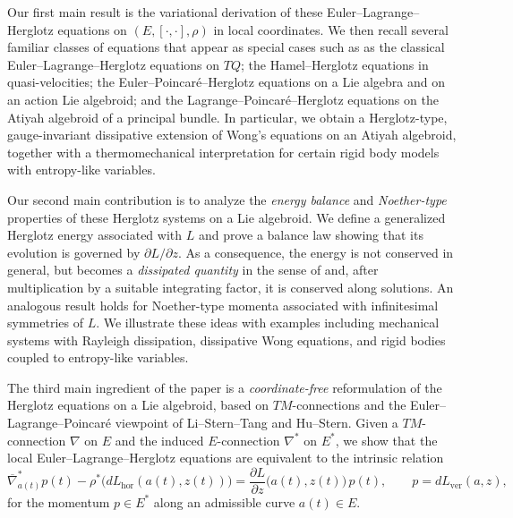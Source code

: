 \documentclass[11pt,a4paper]{article}
\theoremstyle{definition}
\begin{document}
Our first main result is the variational derivation of these
Euler--Lagrange--Herglotz equations on $(E,[\cdot,\cdot],\rho)$ in local coordinates. We then recall several familiar classes of equations that appear
as special cases such as as the classical Euler--Lagrange--Herglotz equations on $TQ$; the Hamel--Herglotz equations in quasi-velocities; the Euler--Poincar\'e--Herglotz equations on a Lie algebra and on an
        action Lie algebroid;
 and the Lagrange--Poincar\'e--Herglotz equations on the Atiyah algebroid
        of a principal bundle. In particular, we obtain a Herglotz-type, gauge-invariant dissipative
extension of Wong's equations on an Atiyah algebroid, together with a
thermomechanical interpretation for certain rigid body models with
entropy-like variables.

Our second main contribution is to analyze the \emph{energy balance} and
\emph{Noether-type} properties of these Herglotz systems on a Lie
algebroid.
We define a generalized Herglotz energy associated with $L$ and prove
a balance law showing that its evolution is governed by
$\partial L/\partial z$.
As a consequence, the energy is not conserved in general, but becomes
a \emph{dissipated quantity} in the sense of \cite{de2021symmetries} and,
after multiplication by a suitable integrating factor, it is
conserved along solutions.
An analogous result holds for Noether-type momenta associated with
infinitesimal symmetries of $L$.
We illustrate these ideas with examples including mechanical systems
with Rayleigh dissipation, dissipative Wong equations, and rigid bodies
coupled to entropy-like variables.

The third main ingredient of the paper is a \emph{coordinate-free}
reformulation of the Herglotz equations on a Lie algebroid, based on
$TM$-connections and the Euler--Lagrange--Poincar\'e viewpoint of
Li--Stern--Tang and Hu--Stern.
Given a $TM$-connection $\nabla$ on $E$ and the induced $E$-connection
$\nabla^*$ on $E^*$, we show that the local Euler--Lagrange--Herglotz
equations are equivalent to the intrinsic relation
\[
\overline{\nabla}^*_{a(t)}p(t)
-
\rho^*\!\big(dL_{\mathrm{hor}}(a(t),z(t))\big)
=\frac{\partial L}{\partial z}\big(a(t),z(t)\big)\,p(t),
\qquad
p = dL_{\mathrm{ver}}(a,z),
\]
for the momentum $p\in E^*$ along an admissible curve $a(t)\in E$.
\end{document}
